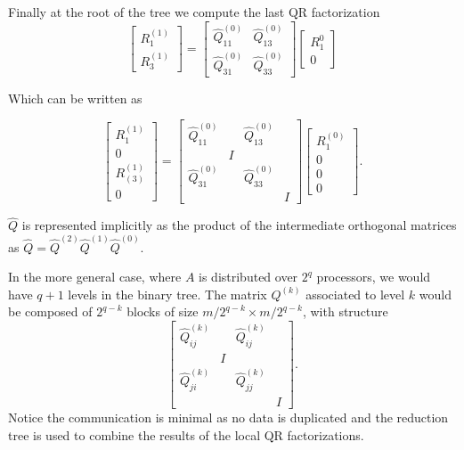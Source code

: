 \documentclass[a4paper, 12pt,oneside]{article}
\begin{document}
		Finally at the root of the tree we compute the last QR factorization
		$$
		\left[\begin{array}{c}
		R_1^{(1)} \\
		R_3^{(1)}
		\end{array}\right]=\left[\begin{array}{ll}
		\hat{Q}_{11}^{(0)} & \hat{Q}_{13}^{(0)} \\
		\hat{Q}_{31}^{(0)} & \hat{Q}_{33}^{(0)}
		\end{array}\right]\left[\begin{array}{c}
		R_1^0 \\
		0
		\end{array}\right]
		$$


		Which can be written as

		$$
		\left[\begin{array}{c}
		R_1^{(1)} \\
		0 \\
		R_{(3)}^{(1)} \\
		0
		\end{array}\right]=\left[\begin{array}{llll}
		\hat{Q}_{11}^{(0)} & & \hat{Q}_{13}^{(0)} & \\
		& I & & \\
		\hat{Q}_{31}^{(0)} & & \hat{Q}_{33}^{(0)} & \\
		& & & I
		\end{array}\right]\left[\begin{array}{c}
		R_1^{(0)} \\
		0 \\
		0 \\
		0
		\end{array}\right] .
		$$

		$\hat{Q}$ is represented implicitly as the product of the intermediate orthogonal matrices as ${\hat Q}={\hat Q}^{(2)}{\hat Q}^{(1)}{\hat Q}^{(0)}$.

		In the more general case, where $A$ is distributed over $2^q$ processors, we would have $q+1$ levels in the binary tree. The matrix $Q^{(k)}$ associated to level $k$ would be composed of $2^{q-k}$ blocks of size $m/2^{q-k} \times m/2^{q-k}$, with structure 
		$$
		\left[\begin{array}{llll}
		\hat{Q}_{ij}^{(k)} & & \hat{Q}_{ij}^{(k)} & \\
		& I & & \\
		\hat{Q}_{ji}^{(k)} & & \hat{Q}_{jj}^{(k)} & \\
		& & & I
		\end{array}\right].
		$$
		Notice the communication is minimal as no data is duplicated and the reduction tree is used to combine the results of the local QR factorizations.
\end{document}
